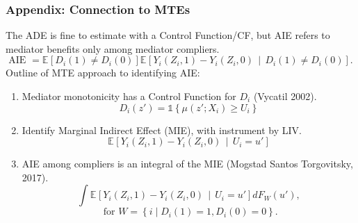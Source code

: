 \documentclass[dvipsnames]{beamer} %
\renewcommand{\vec}[1]{\boldsymbol{\mathit{#1}}}                           %
\newcommand{\E}[2][]{\mathbb{E}_{#1} \left[ #2 \right]}                    %
\newcommand{\Egiven}[3][]{\mathbb{E}_{#1} \left[ #2 \, \middle\vert \, #3 \right]} %
\newcommand{\indicator}[1]{\mathds{1}\left\{ #1 \right\}}                  %
\begin{document}
\begin{frame}[noframenumbering]
    \frametitle{Appendix: Connection to MTEs}
    \label{MTEs}
    The ADE is fine to estimate with a Control Function/CF, but AIE refers to mediator benefits only among mediator compliers.
    \[ \text{AIE } =
    \E{D_i(1) \neq D_i(0)} 
    \Egiven{Y_i(Z_i, 1) - Y_i(Z_i, 0)}{D_i(1) \neq  D_i(0)}. \]
    Outline of MTE approach to identifying AIE:
    \begin{enumerate}
        \item Mediator monotonicity has a Control Function for $D_i$ (Vycatil 2002).
        \[ D_i(z') = \indicator{ \mu(z'; \vec X_i) \geq U_i } \]
        \item Identify Marginal Indirect Effect (MIE), with instrument by LIV.
        \[ \Egiven{Y_i(Z_i, 1) - Y_i(Z_i, 0)}{U_i = u'} \]
        \item AIE among compliers is an integral of the MIE (Mogstad Santos Torgovitsky, 2017). 
        \[ \int \Egiven{Y_i(Z_i, 1) - Y_i(Z_i, 0)}{U_i = u'} dF_W(u'), \]
        \[ \text{ for } 
            W = \left\{ i \; \Big| \; D_i(1) = 1, D_i(0) = 0 \right\}. \]
    \end{enumerate}
\end{frame}
\end{document}
